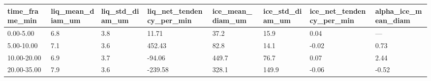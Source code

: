 \begin{tabular}{llllllll}
\toprule
time_frame_min & liq_mean_diam_um & liq_std_diam_um & liq_net_tendency_per_min & ice_mean_diam_um & ice_std_diam_um & ice_net_tendency_per_min & alpha_ice_mean_diam \\
\midrule
0.00-5.00 & 6.8 & 3.8 & 11.71 & 37.2 & 15.9 & 0.04 & — \\
5.00-10.00 & 7.1 & 3.6 & 452.43 & 82.8 & 14.1 & -0.02 & 0.73 \\
10.00-20.00 & 6.9 & 3.7 & -94.06 & 449.7 & 76.7 & 0.07 & 2.44 \\
20.00-35.00 & 7.9 & 3.6 & -239.58 & 328.1 & 149.9 & -0.06 & -0.52 \\
\bottomrule
\end{tabular}
